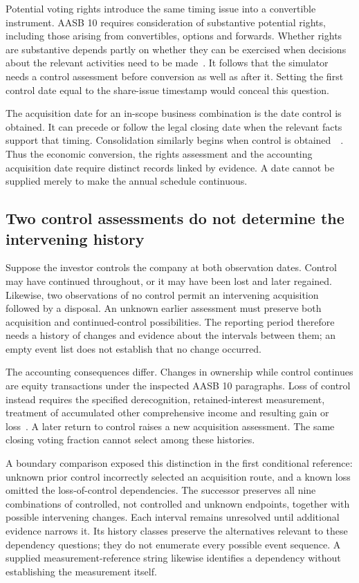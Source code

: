 Potential voting rights introduce the same timing issue into a convertible instrument. AASB 10 requires consideration of substantive potential rights, including those arising from convertibles, options and forwards. Whether rights are substantive depends partly on whether they can be exercised when decisions about the relevant activities need to be made~\citep[paras.~B24, B47--B50]{aasb10control2026}. It follows that the simulator needs a control assessment before conversion as well as after it. Setting the first control date equal to the share-issue timestamp would conceal this question.

The acquisition date for an in-scope business combination is the date control is obtained. It can precede or follow the legal closing date when the relevant facts support that timing. Consolidation similarly begins when control is obtained~\citep[para.~20]{aasb10control2026}~\citep[paras.~8--9]{aasb3scope2026}. Thus the economic conversion, the rights assessment and the accounting acquisition date require distinct records linked by evidence. A date cannot be supplied merely to make the annual schedule continuous.

\subsection{Two control assessments do not determine the intervening history}

Suppose the investor controls the company at both observation dates. Control may have continued throughout, or it may have been lost and later regained. Likewise, two observations of no control permit an intervening acquisition followed by a disposal. An unknown earlier assessment must preserve both acquisition and continued-control possibilities. The reporting period therefore needs a history of changes and evidence about the intervals between them; an empty event list does not establish that no change occurred.

The accounting consequences differ. Changes in ownership while control continues are equity transactions under the inspected AASB 10 paragraphs. Loss of control instead requires the specified derecognition, retained-interest measurement, treatment of accumulated other comprehensive income and resulting gain or loss~\citep[paras.~20, 23, 25, B96, B98--B99]{aasb10control2026}. A later return to control raises a new acquisition assessment. The same closing voting fraction cannot select among these histories.

A boundary comparison exposed this distinction in the first conditional reference: unknown prior control incorrectly selected an acquisition route, and a known loss omitted the loss-of-control dependencies. The successor preserves all nine combinations of controlled, not controlled and unknown endpoints, together with possible intervening changes. Each interval remains unresolved until additional evidence narrows it. Its history classes preserve the alternatives relevant to these dependency questions; they do not enumerate every possible event sequence. A supplied measurement-reference string likewise identifies a dependency without establishing the measurement itself.

